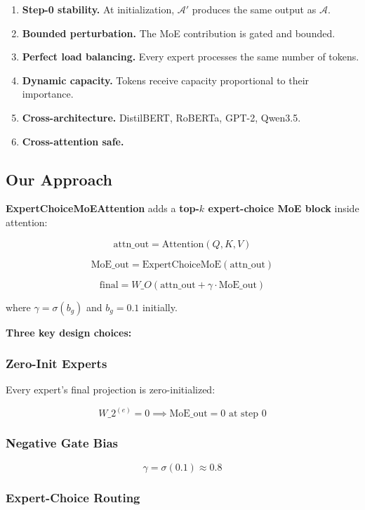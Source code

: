 \begin{enumerate}
\item \textbf{Step-0 stability.} At initialization, $\mathcal{A}'$ produces the
  same output as $\mathcal{A}$.
\item \textbf{Bounded perturbation.} The MoE contribution is gated and bounded.
\item \textbf{Perfect load balancing.} Every expert processes the same number of
  tokens.
\item \textbf{Dynamic capacity.} Tokens receive capacity proportional to their
  importance.
\item \textbf{Cross-architecture.} DistilBERT, RoBERTa, GPT-2, Qwen3.5.
\item \textbf{Cross-attention safe.}

\end{enumerate}
\subsection{Our Approach}

\textbf{ExpertChoiceMoEAttention} adds a \textbf{top-$k$ expert-choice MoE block} 
inside attention:

\[
\text{attn\_out} = \text{Attention}(Q, K, V)
\tag{1.1}
\]

\[
\text{MoE\_out} = \text{ExpertChoiceMoE}(\text{attn\_out})
\tag{1.2}
\]

\[
\text{final} = W\_O \left( \text{attn\_out} + \gamma \cdot \text{MoE\_out} \right)
\tag{1.3}
\]

where $\gamma = \sigma(b_g)$ and $b_g = 0.1$ initially.

\textbf{Three key design choices:}

\subsubsection{Zero-Init Experts}

Every expert's final projection is zero-initialized:

\[
W\_2^{(e)} = 0 \implies \text{MoE\_out} = 0 \text{ at step 0}
\tag{1.4}
\]

\subsubsection{Negative Gate Bias}

\[
\gamma = \sigma(0.1) \approx 0.8
\tag{1.5}
\]

\subsubsection{Expert-Choice Routing}

